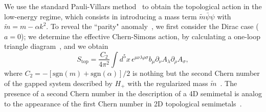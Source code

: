 \documentclass[twocolumn,prl,10pt,superscriptaddress]{revtex4}
\begin{document}

We use the standard Pauli-Villars method~\cite{Hank2} to obtain the topological action in the low-energy regime, which consists in introducing a mass term $\tilde{m}\bar{\psi}\psi$ with $\tilde{m}=m-\alpha k^2$. To reveal the ``parity" anomaly~\cite{FNpre}, we first consider the Dirac case ($a=0$); we determine the effective Chern-Simons action, by calculating a one-loop triangle diagram~\cite{SM,Qi}, and we obtain
\begin{equation}\label{CS}
S_{\text{top}}=\frac{C_2}{4\pi^2}\int d^5x\, \epsilon^{\mu\nu\lambda\rho\sigma} b_{\mu}\partial_{\nu}A_{\lambda}\partial_{\rho}A_{\sigma},
\end{equation}
where $C_2=-\left[\text{sgn}(m)+\text{sgn}(\alpha)\right]/2$ is nothing but the second Chern number of the gapped system described by $H_+$ with the regularized mass $\tilde{m}$~\cite{Golterman,Fukaya,Hughes}. The presence of a second Chern number in the description of a 4D semimetal is analog to the appearance of the first Chern number in 2D topological semimetals~\cite{Zhu2,Hughes}.




\end{document}
